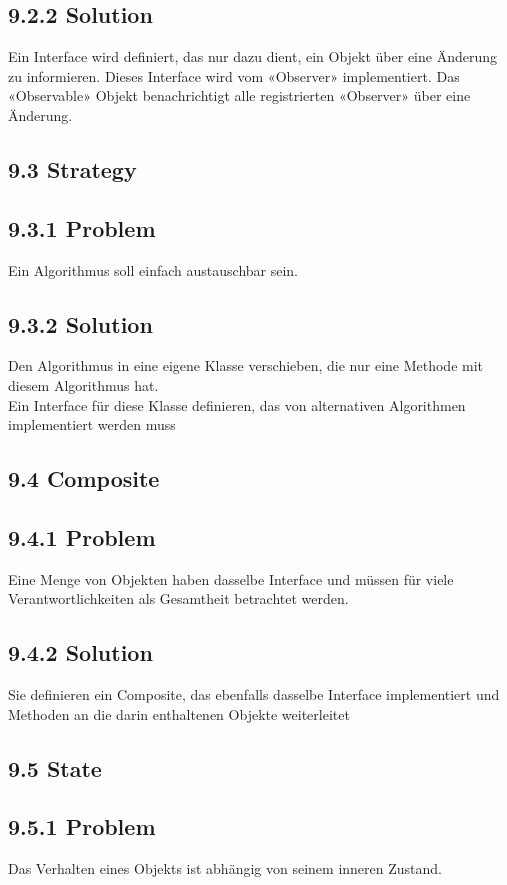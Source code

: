 \documentclass[10pt]{article}
\begin{document}
\subsection*{9.2.2 Solution}
Ein Interface wird definiert, das nur dazu dient, ein Objekt über eine Änderung zu informieren. Dieses Interface wird vom «Observer» implementiert. Das\\
«Observable» Objekt benachrichtigt alle registrierten «Observer» über eine Änderung.

\subsection*{9.3 Strategy}
\subsection*{9.3.1 Problem}
Ein Algorithmus soll einfach austauschbar sein.

\subsection*{9.3.2 Solution}
Den Algorithmus in eine eigene Klasse verschieben, die nur eine Methode mit diesem Algorithmus hat.\\
Ein Interface für diese Klasse definieren, das von alternativen Algorithmen implementiert werden muss

\subsection*{9.4 Composite}
\subsection*{9.4.1 Problem}
Eine Menge von Objekten haben dasselbe Interface und müssen für viele Verantwortlichkeiten als Gesamtheit betrachtet werden.

\subsection*{9.4.2 Solution}
Sie definieren ein Composite, das ebenfalls dasselbe Interface implementiert und Methoden an die darin enthaltenen Objekte weiterleitet

\subsection*{9.5 State}
\subsection*{9.5.1 Problem}
Das Verhalten eines Objekts ist abhängig von seinem inneren Zustand.
\end{document}
